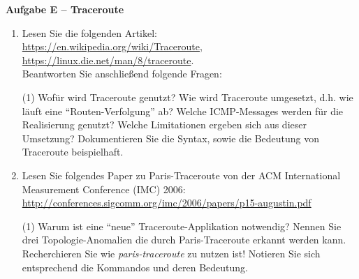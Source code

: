 \documentclass[paper=a4,fontsize=11pt]{scrartcl}%
\numberwithin{equation}{section}
\begin{document}
\begin{center}\Large{\textbf{Aufgabe E -- Traceroute}}\end{center}\vskip0.2in
\begin{enumerate}
	\item Lesen Sie die folgenden Artikel:\\
	\url{https://en.wikipedia.org/wiki/Traceroute},\\
	\url{https://linux.die.net/man/8/traceroute}.\\
	Beantworten Sie anschließend folgende Fragen:
	\begin{tasks}(1)
		\task Wofür wird Traceroute genutzt?
		\task Wie wird Traceroute umgesetzt, d.h. wie läuft eine \enquote{Routen-Verfolgung} ab? 
		\task Welche ICMP-Messages werden für die Realisierung genutzt?
		\task Welche Limitationen ergeben sich aus dieser Umsetzung?
		\task Dokumentieren Sie die Syntax, sowie die Bedeutung von Traceroute beispielhaft.
	\end{tasks}
	\item Lesen Sie folgendes Paper zu Paris-Traceroute \cite{Augustin2006ATA} von der ACM International Measurement Conference (IMC) 2006:\\
	\url{http://conferences.sigcomm.org/imc/2006/papers/p15-augustin.pdf}
	\begin{tasks}(1)
		\task Warum ist eine \enquote{neue} Traceroute-Applikation notwendig?
		\task Nennen Sie drei Topologie-Anomalien die durch Paris-Traceroute erkannt werden kann.
		\task Recherchieren Sie wie \emph{paris-traceroute} zu nutzen ist! Notieren Sie sich entsprechend die Kommandos und deren Bedeutung.
	\end{tasks}
\end{enumerate}


\end{document}
